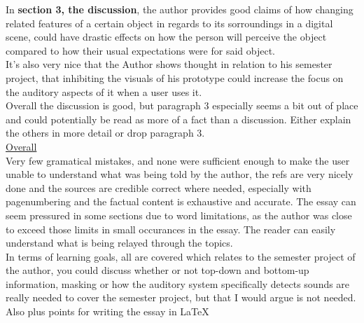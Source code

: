 In \textbf{section 3, the discussion}, the author provides good claims of how changing related features of a certain object in regards to its sorroundings in a digital scene, could have drastic effects on how the person will perceive the object compared to how their usual expectations were for said object.\\It's also very nice that the Author shows thought in relation to his semester project, that inhibiting the visuals of his prototype could increase the focus on the auditory aspects of it when a user uses it.\\Overall the discussion is good, but paragraph 3 especially seems a bit out of place and could potentially be read as more of a fact than a discussion. Either explain the others in more detail or drop paragraph 3.\medskip \\
\underline{Overall}\\
Very few gramatical mistakes, and none were sufficient enough to make the user unable to understand what was being told by the author, the refs are very nicely done and the sources are credible correct where needed, especially with pagenumbering and the factual content is exhaustive and accurate. The essay can seem pressured in some sections due to word limitations, as the author was close to exceed those limits in small occurances in the essay. The reader can easily understand what is being relayed through the topics.\\
In terms of learning goals, all are covered which relates to the semester project of the author, you could discuss whether or not top-down and bottom-up information, masking or how the auditory system specifically detects sounds are really needed to cover the semester project, but that I would argue is not needed.\\
Also plus points for writing the essay in \LaTeX



